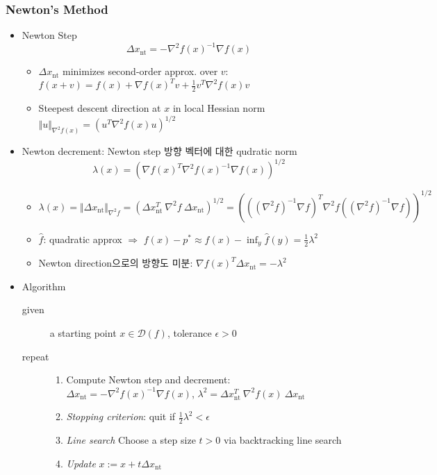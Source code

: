 \subsubsection*{Newton's Method}
\begin{itemize}
    \item Newton Step
        $$ \Delta x_\mathrm{nt}=-\nabla^2f(x)^{-1}\nabla f(x) $$
    \begin{itemize}
        \item $\Delta x_\mathrm{nt}$ minimizes second-order approx. over $v$: $f(x+v)=f(x)+\nabla f(x)^Tv+\frac{1}{2}v^T\nabla^2f(x)v$
        \item Steepest descent direction at $x$ in local Hessian norm $\Vert u\Vert_{\nabla^2 f(x)}=\left(u^T\nabla^2 f(x)u\right)^{1/2}$
    \end{itemize}
    \item Newton decrement: Newton step 방향 벡터에 대한 qudratic norm
        $$ \lambda(x) = \left(\nabla f(x)^T\nabla^2f(x)^{-1}\nabla f(x)\right)^{1/2} $$
    \begin{itemize}
        \item $\lambda(x)=\Vert\Delta x_\mathrm{nt}\Vert_{\nabla^2f}=(\Delta x_\mathrm{nt}^T~\nabla^2f~\Delta x_\mathrm{nt})^{1/2}=\left(((\nabla^2 f)^{-1}\nabla f)^T\nabla^2 f((\nabla^2 f)^{-1}\nabla f)\right)^{1/2}$
        \item $\hat{f}$: quadratic approx $\Rightarrow$ $f(x)-p^\ast\approx f(x)-\inf_y\hat{f}(y)=\frac{1}{2}\lambda^2$
        \item Newton direction으로의 방향도 미분: $\nabla f(x)^T\Delta x_\mathrm{nt}=-\lambda^2$
    \end{itemize}
    \item Algorithm
    \begin{description}
        \item[given] a starting point $x\in\mathcal{D}(f)$, tolerance $\epsilon>0$
        \item[repeat] \phantom{}
        \begin{enumerate}
            \item Compute Newton step and decrement: $\Delta x_\mathrm{nt}=-\nabla^2f(x)^{-1}\nabla f(x)$, $\lambda^2=\Delta x_\mathrm{nt}^T~\nabla^2f(x)~\Delta x_\mathrm{nt}$
            \item \textit{Stopping criterion}: quit if $\frac{1}{2}\lambda^2<\epsilon$
            \item \textit{Line search} Choose a step size $t>0$ via backtracking line search
            \item \textit{Update} $x:=x+t\Delta x_\mathrm{nt}$

\end{enumerate}
\end{description}
\end{itemize}
